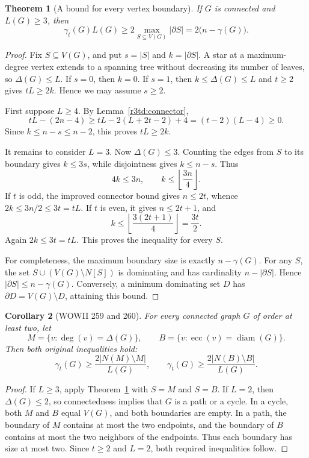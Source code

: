 \documentclass[11pt,a4paper]{article}
\newtheorem{theorem}{Theorem}[section]
\newtheorem{corollary}[theorem]{Corollary}
\theoremstyle{remark}
\begin{document}
\begin{theorem}[A bound for every vertex boundary]
\label{r3td:boundary}
If $G$ is connected and $L(G)\ge3$, then
\begin{equation}
\label{r3td:general}
 \gamma_t(G)L(G)\ge
 2\max_{S\subseteq V(G)}|\partial S|
 =2\bigl(n-\gamma(G)\bigr).
\end{equation}
\end{theorem}
\begin{proof}
Fix $S\subseteq V(G)$, and put $s=|S|$ and $k=|\partial S|$. A star at
a maximum-degree vertex extends to a spanning tree without decreasing
its number of leaves, so $\Delta(G)\le L$. If $s=0$, then $k=0$. If
$s=1$, then $k\le\Delta(G)\le L$ and $t\ge2$ gives $tL\ge2k$. Hence
we may assume $s\ge2$.

First suppose $L\ge4$. By Lemma~\ref{r3td:connector},
\[
 tL-(2n-4)
 \ge tL-2(L+2t-2)+4
 =(t-2)(L-4)\ge0.
\]
Since $k\le n-s\le n-2$, this proves $tL\ge2k$.

It remains to consider $L=3$. Now $\Delta(G)\le3$. Counting the edges
from $S$ to its boundary gives $k\le3s$, while disjointness gives
$k\le n-s$. Thus
\[
 4k\le3n,\qquad k\le\left\lfloor\frac{3n}{4}\right\rfloor.
\]
If $t$ is odd, the improved connector bound gives $n\le2t$, whence
$2k\le3n/2\le3t=tL$. If $t$ is even, it gives $n\le2t+1$, and
\[
 k\le\left\lfloor\frac{3(2t+1)}4\right\rfloor
 =\frac{3t}{2}.
\]
Again $2k\le3t=tL$. This proves the inequality for every $S$.

For completeness, the maximum boundary size is exactly $n-\gamma(G)$.
For any $S$, the set $S\cup(V(G)\setminus N[S])$ is dominating and has
cardinality $n-|\partial S|$. Hence $|\partial S|\le n-\gamma(G)$.
Conversely, a minimum dominating set $D$ has
$\partial D=V(G)\setminus D$, attaining this bound.
\end{proof}

\begin{corollary}[WOWII 259 and 260]
\label{r3td:259260}
For every connected graph $G$ of order at least two, let
\[
 M=\{v:\deg(v)=\Delta(G)\},\qquad
 B=\{v:\operatorname{ecc}(v)=\operatorname{diam}(G)\}.
\]
Then both original inequalities hold:
\[
 \gamma_t(G)\ge\frac{2|N(M)\setminus M|}{L(G)},
 \qquad
 \gamma_t(G)\ge\frac{2|N(B)\setminus B|}{L(G)}.
\]
\end{corollary}
\begin{proof}
If $L\ge3$, apply Theorem~\ref{r3td:boundary} with $S=M$ and
$S=B$. If $L=2$, then $\Delta(G)\le2$, so connectedness implies that
$G$ is a path or a cycle. In a cycle, both $M$ and $B$ equal $V(G)$,
and both boundaries are empty. In a path, the boundary of $M$ contains
at most the two endpoints, and the boundary of $B$ contains at most
the two neighbors of the endpoints. Thus each boundary has size at
most two. Since $t\ge2$ and $L=2$, both required inequalities follow.
\end{proof}
\end{document}
